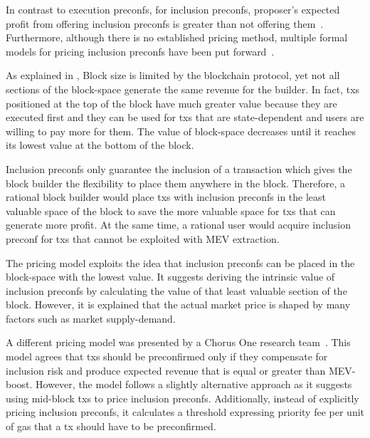 \documentclass[a4paper]{article}
\theoremstyle{boldstyle}
\begin{document}
    In contrast to execution preconfs, for inclusion preconfs, proposer's expected profit from offering inclusion preconfs is greater than not offering them~\cite{W:AnalysingExpectedProposerRevenuefromPreconfirmations}. Furthermore, although there is no established pricing method, multiple formal models for pricing inclusion preconfs have been put forward~\cite{W:APricingModelforInclusionPreconfirmations,W:PricingTransactionsforPreconfirmation}.

    As explained in \cite{W:APricingModelforInclusionPreconfirmations}, Block size is limited by the blockchain protocol, yet not all sections of the block-space generate the same revenue for the builder. In fact, txs positioned at the top of the block have much greater value because they are executed first and they can be used for txs that are state-dependent and users are willing to pay more for them. The value of block-space decreases until it reaches its lowest value at the bottom of the block.
    
    Inclusion preconfs only guarantee the inclusion of a transaction which gives the block builder the flexibility to place them anywhere in the block. Therefore, a rational block builder would place txs with inclusion preconfs in the least valuable space of the block to save the more valuable space for txs that can generate more profit. At the same time, a rational user would acquire inclusion preconf for txs that cannot be exploited with MEV extraction.

    The pricing model exploits the idea that inclusion preconfs can be placed in the block-space with the lowest value. It suggests deriving the intrinsic value of inclusion preconfs by calculating the value of that least valuable section of the block. However, it is explained that the actual market price is shaped by many factors such as market supply-demand.

    A different pricing model was presented by a Chorus One research team~\cite{W:PricingTransactionsforPreconfirmation}. This model agrees that txs should be preconfirmed only if they compensate for inclusion risk and produce expected revenue that is equal or greater than MEV-boost. However, the model follows a slightly alternative approach as it suggests using mid-block txs to price inclusion preconfs. Additionally, instead of explicitly pricing inclusion preconfs, it calculates a threshold expressing priority fee per unit of gas that a tx should have to be preconfirmed.
\end{document}

